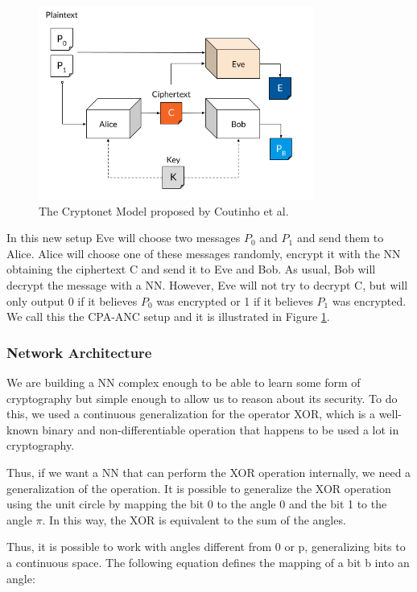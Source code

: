 \documentclass[a4paper]{article}
\begin{document}
      \begin{figure}[H]
        \centering
        \includegraphics[height=2.5in]{../ref/crnet.png}
        \caption{The Cryptonet Model proposed by Coutinho et al.}
        \label{fig:crnet}
      \end{figure}
      
      In this new setup Eve will choose two messages $P_{0}$ and $P_{1}$ and send them to Alice. Alice will
      choose one of these messages randomly, encrypt it with the NN obtaining the ciphertext C and send
      it to Eve and Bob. As usual, Bob will decrypt the message with a NN. However, Eve will not try to
      decrypt C, but will only output 0 if it believes $P_{0}$ was encrypted or 1 if it believes $P_{1}$ was encrypted.
      We call this the CPA-ANC setup and it is illustrated in Figure \ref{fig:crnet}.

      \subsubsection{Network Architecture} \label{sec:crnet_netarch}

      We are building a NN complex enough to be able to learn some form of cryptography
      but simple enough to allow us to reason about its security. To do this, we used a continuous
      generalization for the operator XOR, which is a well-known binary and non-differentiable operation
      that happens to be used a lot in cryptography. \cite{perfanc}

      Thus, if we want a NN that can perform the XOR operation internally, we need a generalization
      of the operation. It is possible to generalize the XOR operation using the unit circle by mapping the bit
      0 to the angle 0 and the bit 1 to the angle $\pi$. 
      In this way, the XOR is equivalent to the sum of the angles.

      \pagebreak
      Thus, it is possible to work with angles
      different from 0 or p, generalizing bits to a continuous space. The following equation defines the
      mapping of a bit b into an angle:
      
\end{document}
